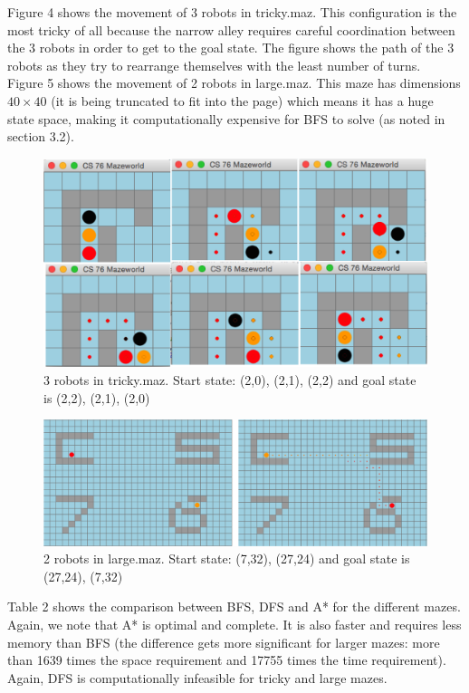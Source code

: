 \documentclass[9.5pt]{extarticle}
\begin{document}
Figure 4 shows the movement of 3 robots in tricky.maz. This configuration is the most tricky of all because the narrow alley requires careful coordination between the 3 robots in order to get to the goal state. The figure shows the path of the 3 robots as they try to rearrange themselves with the least number of turns.\\

Figure 5 shows the movement of 2 robots in large.maz. This maze has dimensions $40 \times 40$ (it is being truncated to fit into the page) which means it has a huge state space, making it computationally expensive for BFS to solve (as noted in  section 3.2).


\begin{figure}[H]
\centering
\includegraphics[scale=0.45]{tricky_multi.png}
\caption{3 robots in tricky.maz. Start state: (2,0), (2,1), (2,2) and goal state is (2,2), (2,1), (2,0) }
\label{Figure 4}
\end{figure}

\begin{figure}[H]
\centering
\includegraphics[scale=0.6]{large_multi.png}
\caption{2 robots in large.maz. Start state: (7,32), (27,24) and goal state is (27,24), (7,32) }
\label{Figure 5}
\end{figure}

Table 2 shows the comparison between BFS, DFS and A* for the different mazes. Again, we note that A* is optimal and complete. It is also faster and requires less memory than BFS (the difference gets more significant for larger mazes: more than 1639 times the space requirement and 17755 times the time requirement). Again, DFS is computationally infeasible for tricky and large mazes.
\end{document}
